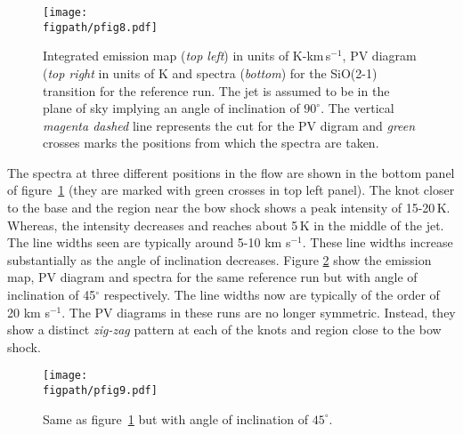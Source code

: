 \documentclass[useAMS,usenatbib]{mn2e}
\newcommand{\figpath}{../NEWFIGS}
\begin{document}
\begin{figure}
 \texttt{[image: \\figpath/pfig8.pdf]}%
 \caption{Integrated emission map ({\it top left}) in units of K-km\,s$^{-1}$, PV diagram ({\it top right}
   in units of K and spectra ({\it bottom}) for the
   SiO(2-1) transition for the reference run. 
   The jet is assumed to be in the plane of sky implying an angle of
   inclination of $90^{\circ}$. The vertical {\it magenta dashed} line
   represents the cut for the PV digram and {\it green} crosses marks the positions from which the spectra are taken.} 
\label{empvspec90}
\end{figure}

The spectra at three different positions in the flow are shown in the
bottom panel of figure~\ref{empvspec90} (they are marked with green
crosses in top left panel). The knot closer to the base and the region near the bow shock 
shows a peak intensity of 15-20\,K. Whereas, the 
intensity decreases and reaches about 5\,K in the middle of the jet.
The line widths seen are typically around 5-10 km s$^{-1}$.
These line widths increase substantially as the angle of inclination
decreases. Figure \ref{empvspec45} show the
emission map, PV diagram and spectra for the same reference run but
with angle of inclination of 45$^{\circ}$
respectively. The line 
widths now are typically of the order of 20 km s$^{-1}$. 
The PV diagrams in these runs are no longer symmetric. Instead, they show a distinct {\it zig-zag}
pattern at each of the knots and region close to the bow shock.



\begin{figure}
 \texttt{[image: \\figpath/pfig9.pdf]}%
 \caption{Same as figure~\ref{empvspec90} but with angle of
   inclination of $45^{\circ}$.} 
\label{empvspec45}
\end{figure}

\end{document}
